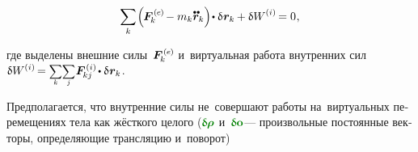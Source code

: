 \begin{otherlanguage}{russian}
\nopagebreak\vspace{-0.2em}\begin{equation}\label{discrete:principleofvirtualwork.externalinternal}
\displaystyle \sum_k \hspace{-0.2ex} \left(^{\mathstrut} \hspace{-0.25ex} \bm{F}^{\smthexternal}_{\hspace{-0.16ex}k} \hspace{-0.1ex} - m_k \mathdotdotabove{\bm{r}}_k \right) \hspace{-0.32ex} \dotp \variation{\hspace{.1ex}\bm{r}_k} \hspace{-0.1ex}
+ \variation{\internalwork} \hspace{-0.1ex} = 0 \hspace{.1ex},
\vspace{-0.25em}\end{equation}

\vspace{-0.1em} \noindent где выделены внешние силы~${\bm{F}^{\smthexternal}_{\hspace{-0.16ex}k}}$ и~виртуальная работа внутренних сил
${\variation{\internalwork} \hspace{-0.12ex} = \scalebox{0.8}[0.84]{$\displaystyle \underset{\raisemath{.25ex}{\smash{k}}}{\sum}$} \scalebox{0.8}[0.84]{$\displaystyle \underset{\raisemath{.25ex}{\smash{j}}}{\sum}$} \hspace{.12ex} \bm{F}^{\smthinternal}_{\hspace{-0.16ex}kj} \hspace{-0.1ex} \dotp \variation{\hspace{.1ex}\bm{r}_k} \hspace{.1ex}}$.

\vspace{-0.1em} Предполагается, что внутренние силы не~совершают работы на~виртуальных перемещениях тела как жёсткого целого (${\constvarvector{\hspace{-0.1ex}\bm{\rho}}}$ и~${\constvarvector{\bm{o}}}$\:--- произвольные постоянные векторы, определяющие трансляцию и~поворот)


\end{otherlanguage}
